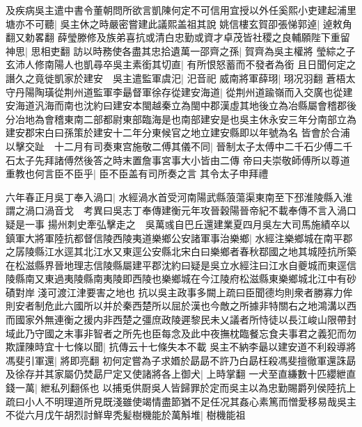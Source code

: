及疾病吳主遣中書令董朝問所欲言凱陳何定不可信用宜授以外任奚熙小吏建起浦里塘亦不可聽|{
	吳主休之時嚴密嘗建此議熙盖祖其說}
姚信樓玄賀卲張悌郭逴|{
	逴敕角翻又勅畧翻}
薛瑩滕修及族弟喜抗或清白忠勤或資才卓茂皆社稷之良輔願陛下重留神思|{
	思相吏翻}
訪以時務使各盡其忠拾遺萬一邵齊之孫|{
	賀齊為吳主權將}
瑩綜之子玄沛人修南陽人也凱尋卒吳主素銜其切直|{
	有所恨怒蓄而不發者為銜}
且日聞何定之譖久之竟徙凱家於建安　吳主遣監軍虞汜|{
	汜音祀}
威南將軍薛珝|{
	珝况羽翻}
蒼梧太守丹陽陶璜從荆州道監軍李朂督軍徐存從建安海道|{
	從荆州道踰嶺而入交廣也從建安海道汎海而南也沈約曰建安本閩越秦立為閩中郡漢虛其地後立為冶縣屬會稽郡後分冶地為會稽東南二部都尉東部臨海是也南部建安是也吳主休永安三年分南部立為建安郡宋白曰孫策於建安十二年分東候官之地立建安縣即以年號為名}
皆會於合浦以擊交趾　十二月有司奏東宫施敬二傅其儀不同|{
	晉制太子太傅中二千石少傅二千石太子先拜諸傅然後答之時末置詹事宮事大小皆由二傳}
帝曰夫崇敬師傅所以尊道重教也何言臣不臣乎|{
	臣不臣盖有司所奏之言}
其令太子申拜禮

六年春正月吳丁奉入渦口|{
	水經渦水首受河南陽武縣蒗蕩渠東南至下邳淮陵縣入淮謂之渦口渦音戈　考異曰吳志丁奉傳建衡元年攻晉穀陽晉帝紀不載奉傳不言入渦口疑是一事}
揚州刺史牽弘擊走之　吳萬彧自巴丘還建業夏四月吳左大司馬施績卒以鎮軍大將軍陸抗都督信陵西陵夷道樂鄉公安諸軍事治樂鄉|{
	水經注樂鄉城在南平郡之孱陵縣江水逕其北江水又東逕公安縣北宋白曰樂鄉者春秋鄀國之地其城陸抗所築在松滋縣界晉地理志信陵縣屬建平郡沈約曰疑是吳立水經注曰江水自夔城而東逕信陵縣南又東過夷陵縣南夷陵即西陵也樂鄉城在今江陵府松滋縣東樂鄉城北江中有砂磧對岸淺可渡江津要害之地也}
抗以吳主政事多闕上疏曰臣聞德均則衆者勝寡力侔則安者制危此六國所以并於秦西楚所以屈於漢也今敵之所據非特關右之地鴻溝以西而國家外無連衡之援内非西楚之彊庶政陵遲黎民未乂議者所恃徒以長江峻山限帶封域此乃守國之末事非智者之所先也臣每念及此中夜撫枕臨餐忘食夫事君之義犯而勿欺謹陳時宜十七條以聞|{
	抗傳云十七條失本不載}
吳主不納李朂以建安道不利殺導將馮斐引軍還|{
	將即亮翻}
初何定嘗為子求㛰於勗勗不許乃白勗枉殺馮斐擅徹軍還誅勗及徐存并其家屬仍焚勗尸定又使諸將各上御犬|{
	上時掌翻}
一犬至直縑數十匹纓紲直錢一萬|{
	紲私列翻係也}
以捕兎供㕑吳人皆歸罪於定而吳主以為忠勤賜爵列侯陸抗上疏曰小人不明理道所見既淺雖使竭情盡節猶不足任况其姦心素篤而憎愛移易哉吳主不從六月戊午胡烈討鮮卑秃髪樹機能於萬斛堆|{
	樹機能祖}


